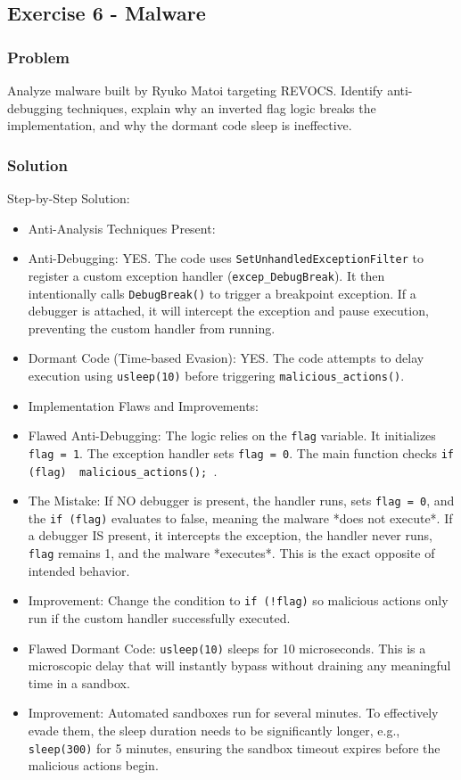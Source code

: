 \documentclass{article}
\begin{document}
\subsection{Exercise 6 - Malware}
\subsubsection*{Problem}
Analyze malware built by Ryuko Matoi targeting REVOCS. Identify anti-debugging techniques, explain why an inverted flag logic breaks the implementation, and why the dormant code sleep is ineffective.

\subsubsection*{Solution}
Step-by-Step Solution:

\begin{itemize}
    \item[\textbf{1.}] Anti-Analysis Techniques Present:
    \item Anti-Debugging: YES. The code uses \texttt{SetUnhandledExceptionFilter} to register a custom exception handler (\texttt{excep\_DebugBreak}). It then intentionally calls \texttt{DebugBreak()} to trigger a breakpoint exception. If a debugger is attached, it will intercept the exception and pause execution, preventing the custom handler from running.
    \item Dormant Code (Time-based Evasion): YES. The code attempts to delay execution using \texttt{usleep(10)} before triggering \texttt{malicious\_actions()}.

    \item[\textbf{2.}] Implementation Flaws and Improvements:
    \item Flawed Anti-Debugging: The logic relies on the \texttt{flag} variable. It initializes \texttt{flag = 1}. The exception handler sets \texttt{flag = 0}. The main function checks \texttt{if (flag) { malicious\_actions(); }}.
    \item The Mistake: If NO debugger is present, the handler runs, sets \texttt{flag = 0}, and the \texttt{if (flag)} evaluates to false, meaning the malware *does not execute*. If a debugger IS present, it intercepts the exception, the handler never runs, \texttt{flag} remains 1, and the malware *executes*. This is the exact opposite of intended behavior.
    \item Improvement: Change the condition to \texttt{if (!flag)} so malicious actions only run if the custom handler successfully executed.
    \item Flawed Dormant Code: \texttt{usleep(10)} sleeps for 10 microseconds. This is a microscopic delay that will instantly bypass without draining any meaningful time in a sandbox.
    \item Improvement: Automated sandboxes run for several minutes. To effectively evade them, the sleep duration needs to be significantly longer, e.g., \texttt{sleep(300)} for 5 minutes, ensuring the sandbox timeout expires before the malicious actions begin.
\end{itemize}
\end{document}
